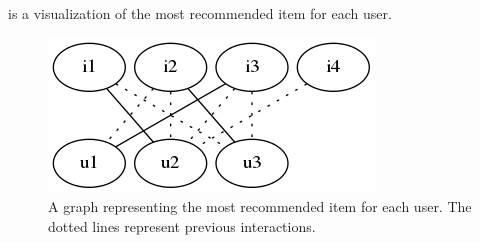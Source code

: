  is a visualization of the most recommended item for each user.

\begin{figure}[h!]
    \centering
    \includegraphics[width=0.3\linewidth]{fig/example_run/item_user_graph_katz_rec.png}
    \caption{A graph representing the most recommended item for each user. The dotted lines represent previous interactions.}
    \label{fig:ex_graph_katz_rec}
\end{figure}

\FloatBarrier

